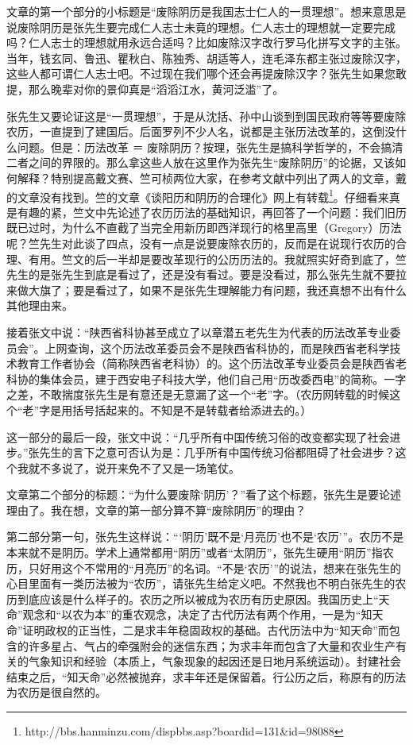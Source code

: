 文章的第一个部分的小标题是“废除阴历是我国志士仁人的一贯理想”。想来意思是说废除阴历是张先生要完成仁人志士未竟的理想。仁人志士的理想就一定要完成吗？仁人志士的理想就用永远合适吗？比如废除汉字改行罗马化拼写文字的主张。当年，钱玄同、鲁迅、瞿秋白、陈独秀、胡适等人，连毛泽东都主张过废除汉字，这些人都可谓仁人志士吧。不过现在我们哪个还会再提废除汉字？张先生如果您敢提，那么晚辈对你的景仰真是“滔滔江水，黄河泛滥”了。

张先生又要论证这是“一贯理想”，于是从沈括、孙中山谈到到国民政府等等要废除农历，一直提到了建国后。后面罗列不少人名，说都是主张历法改革的，这倒没什么问题。但是：历法改革 ＝ 废除阴历？按理，张先生是搞科学哲学的，不会搞清二者之间的界限的。那么拿这些人放在这里作为张先生“废除阴历”的论据，又该如何解释？特别提高戴文赛、竺可桢两位大家，在参考文献中列出了两人的文章，戴的文章没有找到。竺的文章《谈阳历和阴历的合理化》网上有转载\footnote{http://bbs.hanminzu.com/dispbbs.asp?boardid=131\&id=98088}。仔细看来真是有趣的紧，竺文中先论述了农历历法的基础知识，再回答了一个问题：我们旧历既已过时，为什么不直截了当完全用新历即西洋现行的格里高里（Gregory）历法呢？竺先生对此谈了四点，没有一点是说要废除农历的，反而是在说现行农历的合理、有用。竺文的后一半却是要改革现行的公历历法的。我就照实好奇到底了，竺先生的是张先生到底是看过了，还是没有看过。要是没看过，那么张先生就不要拉来做大旗了；要是看过了，如果不是张先生理解能力有问题，我还真想不出有什么其他理由来。

接着张文中说：“陕西省科协甚至成立了以章潜五老先生为代表的历法改革专业委员会”。上网查询，这个历法改革委员会不是陕西省科协的，而是陕西省老科学技术教育工作者协会（简称陕西省老科协）的。这个历法改革专业委员会是陕西省老科协的集体会员，建于西安电子科技大学，他们自己用“历改委西电”的简称。一字之差，不敢揣度张先生是有意还是无意漏了这一个“老”字。（农历网转载的时候这个“老”字是用括号括起来的。不知是不是转载者给添进去的。）

这一部分的最后一段，张文中说：“几乎所有中国传统习俗的改变都实现了社会进步。”张先生的言下之意可否认为是：几乎所有中国传统习俗都阻碍了社会进步？这个我就不多说了，说开来免不了又是一场笔仗。

文章第二个部分的标题：“为什么要废除‘阴历’？”看了这个标题，张先生是要论述理由了。我在想，文章的第一部分算不算“废除阴历”的理由？

第二部分第一句，张先生这样说：“‘阴历’既不是‘月亮历’也不是‘农历’”。农历不是本来就不是阴历。学术上通常都用“阴历”或者“太阴历”，张先生硬用“阴历”指农历，只好用这个不常用的“月亮历”的名词。“不是‘农历’”的说法，想来在张先生的心目里面有一类历法被为“农历”，请张先生给定义吧。不然我也不明白张先生的农历到底应该是什么样子的。农历之所以被成为农历有历史原因。我国历史上“天命”观念和“以农为本”的重农观念，决定了古代历法有两个作用，一是为“知天命”证明政权的正当性，二是求丰年稳固政权的基础。古代历法中为“知天命”而包含的许多星占、气占的牵强附会的迷信东西；为求丰年而包含了大量和农业生产有关的气象知识和经验（本质上，气象现象的起因还是日地月系统运动）。封建社会结束之后，“知天命”必然被抛弃，求丰年还是保留着。行公历之后，称原有的历法为农历是很自然的。

